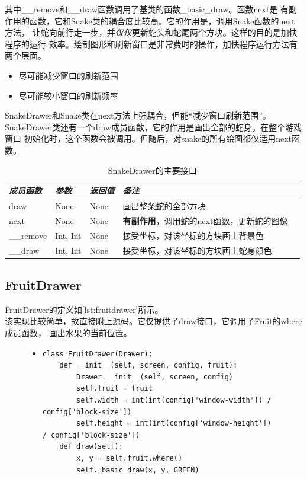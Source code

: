 \documentclass[a4paper]{article}
\begin{document}
其中\_\_remove和\_\_draw函数调用了基类的函数\_basic\_draw。函数next是
有副作用的函数，它和Snake类的耦合度比较高。它的作用是，调用Snake函数的next方法，
让蛇向前行走一步，并\emph{仅仅}更新蛇头和蛇尾两个方块。这样的目的是加快程序的运行
效率。绘制图形和刷新窗口是非常费时的操作，加快程序运行方法有两个层面。
\begin{itemize}
    \item 尽可能减少窗口的刷新范围
    \item 尽可能较小窗口的刷新频率
\end{itemize}
SnakeDrawer和Snake类在next方法上强耦合，但能``减少窗口刷新范围''。 \\

SnakeDrawer类还有一个draw成员函数，它的作用是画出全部的蛇身。在整个游戏窗口
初始化时，这个函数会被调用。但随后，对snake的所有绘图都仅适用next函数。

\begin{table}[!htb]
\caption{SnakeDrawer的主要接口}\label{tab:snakedrawer-int}
\centering
\begin{tabular}{@{} *5l @{}}
    \toprule
\emph{成员函数} & \emph{参数} & \emph{返回值} & \emph{备注} & \\
    \midrule
    draw & None & None & 画出整条蛇的全部方块 \\
    next & None & None & \textbf{有副作用}，调用蛇的next函数，更新蛇的图像 \\
    \_\_remove & Int, Int & None & 接受坐标，对该坐标的方块画上背景色 \\
    \_\_draw & Int, Int & None & 接受坐标，对该坐标的方块画上蛇身颜色 \\
    \bottomrule
\hline
\end{tabular}
\end{table}

\subsection{FruitDrawer}
FruitDrawer的定义如\autoref{lst:fruitdrawer}所示。\\

该实现比较简单，故直接附上源码。它仅提供了draw接口，它调用了Fruit的where成员函数，
画出水果的当前位置。
\begin{figure}[!hbt]
\begin{itemize}
\item[] \begin{lstlisting}[style=mypython, label=lst:fruitdrawer, caption=FruitDrawer定义]
class FruitDrawer(Drawer):
    def __init__(self, screen, config, fruit):
        Drawer.__init__(self, screen, config)
        self.fruit = fruit
        self.width = int(int(config['window-width']) / config['block-size'])
        self.height = int(int(config['window-height']) / config['block-size'])
    def draw(self):
        x, y = self.fruit.where()
        self._basic_draw(x, y, GREEN)
\end{lstlisting}
\end{itemize}
\end{figure}
\end{document}
